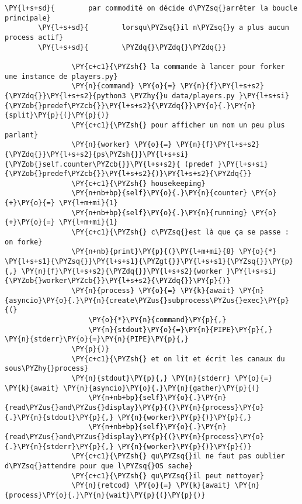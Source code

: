 \begin{Verbatim}[commandchars=\\\{\}]
        \PY{l+s+sd}{        par commodité on décide d\PYZsq{}arrêter la boucle principale}
        \PY{l+s+sd}{        lorsqu\PYZsq{}il n\PYZsq{}y a plus aucun process actif}
        \PY{l+s+sd}{        \PYZdq{}\PYZdq{}\PYZdq{}}
        
                \PY{c+c1}{\PYZsh{} la commande à lancer pour forker une instance de players.py}
                \PY{n}{command} \PY{o}{=} \PY{n}{f}\PY{l+s+s2}{\PYZdq{}}\PY{l+s+s2}{python3 \PYZhy{}u data/players.py }\PY{l+s+si}{\PYZob{}predef\PYZcb{}}\PY{l+s+s2}{\PYZdq{}}\PY{o}{.}\PY{n}{split}\PY{p}{(}\PY{p}{)}
                \PY{c+c1}{\PYZsh{} pour afficher un nom un peu plus parlant}
                \PY{n}{worker} \PY{o}{=} \PY{n}{f}\PY{l+s+s2}{\PYZdq{}}\PY{l+s+s2}{ps\PYZsh{}}\PY{l+s+si}{\PYZob{}self.counter\PYZcb{}}\PY{l+s+s2}{ (predef }\PY{l+s+si}{\PYZob{}predef\PYZcb{}}\PY{l+s+s2}{)}\PY{l+s+s2}{\PYZdq{}}
                \PY{c+c1}{\PYZsh{} housekeeping}
                \PY{n+nb+bp}{self}\PY{o}{.}\PY{n}{counter} \PY{o}{+}\PY{o}{=} \PY{l+m+mi}{1}
                \PY{n+nb+bp}{self}\PY{o}{.}\PY{n}{running} \PY{o}{+}\PY{o}{=} \PY{l+m+mi}{1}
                \PY{c+c1}{\PYZsh{} c\PYZsq{}est là que ça se passe : on forke}
                \PY{n+nb}{print}\PY{p}{(}\PY{l+m+mi}{8} \PY{o}{*} \PY{l+s+s1}{\PYZsq{}}\PY{l+s+s1}{\PYZgt{}}\PY{l+s+s1}{\PYZsq{}}\PY{p}{,} \PY{n}{f}\PY{l+s+s2}{\PYZdq{}}\PY{l+s+s2}{worker }\PY{l+s+si}{\PYZob{}worker\PYZcb{}}\PY{l+s+s2}{\PYZdq{}}\PY{p}{)}
                \PY{n}{process} \PY{o}{=} \PY{k}{await} \PY{n}{asyncio}\PY{o}{.}\PY{n}{create\PYZus{}subprocess\PYZus{}exec}\PY{p}{(}
                    \PY{o}{*}\PY{n}{command}\PY{p}{,}
                    \PY{n}{stdout}\PY{o}{=}\PY{n}{PIPE}\PY{p}{,} \PY{n}{stderr}\PY{o}{=}\PY{n}{PIPE}\PY{p}{,}
                \PY{p}{)}
                \PY{c+c1}{\PYZsh{} et on lit et écrit les canaux du sous\PYZhy{}process}
                \PY{n}{stdout}\PY{p}{,} \PY{n}{stderr} \PY{o}{=} \PY{k}{await} \PY{n}{asyncio}\PY{o}{.}\PY{n}{gather}\PY{p}{(}
                    \PY{n+nb+bp}{self}\PY{o}{.}\PY{n}{read\PYZus{}and\PYZus{}display}\PY{p}{(}\PY{n}{process}\PY{o}{.}\PY{n}{stdout}\PY{p}{,} \PY{n}{worker}\PY{p}{)}\PY{p}{,}
                    \PY{n+nb+bp}{self}\PY{o}{.}\PY{n}{read\PYZus{}and\PYZus{}display}\PY{p}{(}\PY{n}{process}\PY{o}{.}\PY{n}{stderr}\PY{p}{,} \PY{n}{worker}\PY{p}{)}\PY{p}{)}
                \PY{c+c1}{\PYZsh{} qu\PYZsq{}il ne faut pas oublier d\PYZsq{}attendre pour que l\PYZsq{}OS sache}
                \PY{c+c1}{\PYZsh{} qu\PYZsq{}il peut nettoyer}
                \PY{n}{retcod} \PY{o}{=} \PY{k}{await} \PY{n}{process}\PY{o}{.}\PY{n}{wait}\PY{p}{(}\PY{p}{)}

\end{Verbatim}
